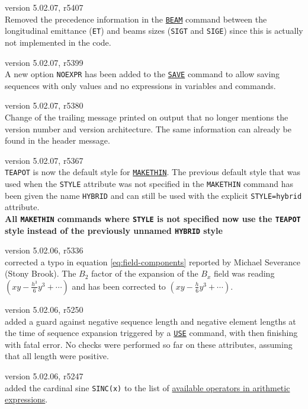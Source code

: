 \begin{madlist}
   version 5.02.07, r5407\\
  Removed the precedence information in the \hyperref[sec:beam]{\texttt{BEAM}} 
  command between the longitudinal emittance (\texttt{ET}) and beams sizes 
  (\texttt{SIGT} and \texttt{SIGE}) since this is actually not implemented in the 
  code.
  
   version 5.02.07, r5399\\
  A new option \texttt{NOEXPR} has been added to the
  \hyperref[sec:save]{\texttt{SAVE}} command to allow saving sequences
  with only values and no expressions in variables and commands.
  
   version 5.02.07, r5380\\
  Change of the trailing message printed on output that no longer 
  mentions the version number and version architecture. 
  The same information can already be found in the header message.

   version 5.02.07, r5367\\
  \texttt{TEAPOT} is now the default style for 
  \hyperref[chap:makethin]{\texttt{MAKETHIN}}. 
  The previous default style that was used when the \texttt{STYLE} 
  attribute was not specified in the \texttt{MAKETHIN} command 
  has been given the name \texttt{HYBRID} 
  and can still be used with the explicit \texttt{STYLE=hybrid} attribute. \\
  \textbf{All \texttt{MAKETHIN} commands where \texttt{STYLE} is not specified now
  use the \texttt{TEAPOT} style instead of the previously unnamed \texttt{HYBRID} 
  style}

   version 5.02.06, r5336 \\
  corrected a typo in equation \ref{eq:field-components} 
  reported by Michael Severance (Stony Brook). 
  The $B_2$ factor of the expansion of the $B_x$ 
  field was reading $(xy - \frac{h^3}{6}y^3+\cdots)$ 
  and has been corrected to $(xy - \frac{h}{6}y^3+\cdots)$.

   version 5.02.06, r5250\\
  added a guard against negative sequence length and negative 
  element lengths at the time of sequence expansion triggered 
  by a \hyperref[sec:use]{\texttt{USE}} command, with \madx then 
  finishing with fatal error. No checks were performed so far 
  on these attributes, assuming that all length were positive.

   version 5.02.06, r5247\\
  added the cardinal sine \texttt{SINC(x)} to the list of 
  \hyperref[subsec:operator]{available operators in arithmetic 
  expressions}.


\end{madlist}
